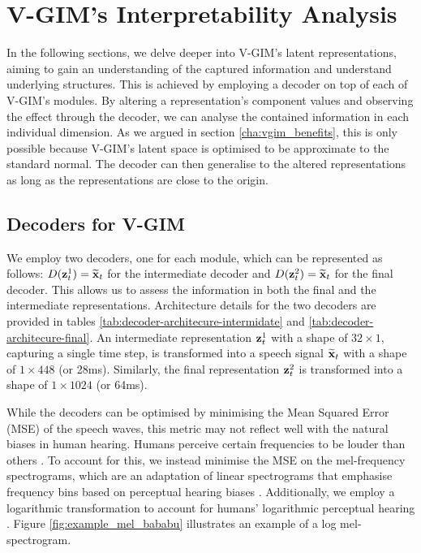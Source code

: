 \section{V-GIM's Interpretability Analysis} 
	In the following sections, we delve deeper into V-GIM's latent representations, aiming to gain an understanding of the captured information and understand underlying structures. This is achieved by employing a decoder on top of each of V-GIM's modules. By altering a representation's component values and observing the effect through the decoder, we can analyse the contained information in each individual dimension. As we argued in section \ref{cha:vgim_benefits}, this is only possible because V-GIM's latent space is optimised to be approximate to the standard normal. The decoder can then generalise to the altered representations as long as the representations are close to the origin.
	
	\subsection{Decoders for V-GIM} \label{cha:experiments_interp_analy_decoder}
		We employ two decoders, one for each module, which can be represented as follows: $D(\mathbf{z}_t^1) = \widetilde{\mathbf{x}}_t$ for the intermediate decoder and $D(\mathbf{z}_t^2) = \widetilde{\mathbf{x}}_t$ for the final decoder. This allows us to assess the information in both the final and the intermediate representations. Architecture details for the two decoders are provided in tables \ref{tab:decoder-architecure-intermidate} and \ref{tab:decoder-architecure-final}. 
		An intermediate representation $\mathbf{z}_t^1$ with a shape of $32 \times 1$, capturing a single time step, is transformed into a speech signal $\widetilde{\mathbf{x}}_t$ with a shape of $1 \times 448$ (or 28ms). Similarly,  the final representation $\mathbf{z}_t^2$ is transformed into a shape of $1 \times 1024$ (or 64ms).
			
		
			
		While the decoders can be optimised by minimising the Mean Squared Error (MSE) of the speech waves, this metric may not reflect well with the natural biases in human hearing. Humans perceive certain frequencies to be louder than others \citep{radkoffLossFunctionsAudio2021, liSupervisedSpeechEnhancement2020}. To account for this, we instead minimise the MSE on the mel-frequency spectrograms, which are an adaptation of linear spectrograms that emphasise frequency bins based on perceptual hearing biases \citep{shenNaturalTTSSynthesis2018}. Additionally, we employ a logarithmic transformation to account for humans' logarithmic perceptual hearing \citep{braunConsolidatedViewLoss2020}. Figure \ref{fig:example_mel_bababu} illustrates an example of a log mel-spectrogram. 
		
